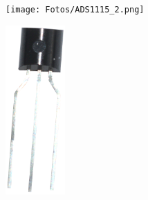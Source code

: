 \begin{minipage}{8cm}
    \centering
    \texttt{[image: Fotos/ADS1115\_2.png]}
\end{minipage}
\begin{minipage}{8cm}
    \centering
    \includegraphics[width=0.17\textwidth]{Fotos/LM35.png}
\end{minipage}\\
\vspace{0.5cm}

